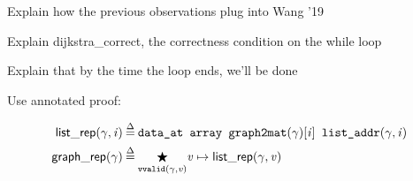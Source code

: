 
Explain how the previous observations plug into Wang '19

Explain dijkstra\_correct, the correctness condition on the while loop

Explain that by the time the loop ends, we'll be done

Use annotated proof:



\begin{equation*}
\begin{split}
\p{list\_rep}(\gamma, \m{i}) &\defeq \texttt{data\_at  array  graph2mat}(\gamma)[\m{i}] \texttt{  list\_addr}(\gamma, \m{i}) \\
\vspace{1em}
\p{graph\_rep}(\gamma) &\defeq \underset{\texttt{vvalid}(\gamma,\m{v})}{\bigstar} \m{v}  \mapsto\p{list\_rep}(\gamma, \m{v})
\end{split}
\end{equation*}
